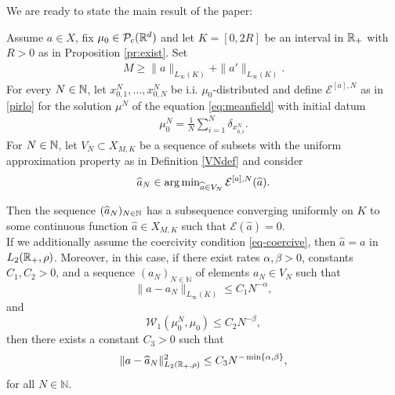 We are ready to state the main result of the paper:

\begin{theorem}\label{thm} Assume $a\in X$, fix $\mu_0 \in \mathcal{P}_c(\mathbb{R}^d)$ and let  $K=[0,2R]$ be an interval in $\mathbb{R}_+$ with $R>0$ as in Proposition \ref{pr:exist}.
	Set
	\begin{align*}
	M \geq \|a\|_{L_{\infty}(K)} + \|a'\|_{L_{\infty}(K)}.
	\end{align*}
	For every $N \in \mathbb{N}$, let $x_{0,1}^N,\ldots,x_{0,N}^N$ be i.i. $\mu_0$-distributed and define  $\mathcal E^{[a],N}$ as in \eqref{pirlo} for the solution $\mu^N$ of the equation \eqref{eq:meanfield} with initial datum
	\begin{align*}
	\mu^N_0 = \frac{1}{N}\sum^N_{i = 1} \delta_{x_{0,i}^N}.
	\end{align*}
	For  $N \in \mathbb{N}$, let $V_N\subset X_{M,K}$ be a sequence of subsets with the uniform approximation property as in Definition \ref{VNdef} and consider
	\begin{align*}
		\widehat a_N\in\operatorname{arg\,min}_{\widehat a\in V_N} \mathcal E^{[a],N}(\widehat a).
	\end{align*}
	
Then the sequence $(\widehat a_{N})_{N \in \mathbb{N}}$ has a subsequence converging uniformly on $K$ to some continuous function $\widehat a \in X_{M,K}$ such that
$\mathcal E(\widehat a)=0$. \\
 If we additionally assume the coercivity condition \eqref{eq-coercive}, then $\widehat a=a$ in $L_2(\mathbb{R}_+,\rho)$. Moreover, in this case, if there exist  rates $\alpha,\beta >0$, constants $C_1,C_2>0$, and a sequence $(a_N)_{N \in \mathbb N}$ of elements $a_N \in V_N$ such that 
\begin{equation}\label{rate1}
 \| a - a_N \|_{L_\infty(K)} \leq C_1 N^{-\alpha},
\end{equation}
and 
\begin{equation}\label{rate2}
 \mathcal W_1(\mu_0^N,\mu_0) \leq C_2 N^{-\beta},
\end{equation}
then there exists a constant $C_3>0$ such that 
\begin{equation}\label{rateapprox}
 \| a - \widehat a_N \|_{L_2(\mathbb{R}_+,\rho)}^2 \leq C_3 N^{-\min\{ \alpha, \beta\}},
\end{equation}
for all $N \in \mathbb N$.

\end{theorem}


